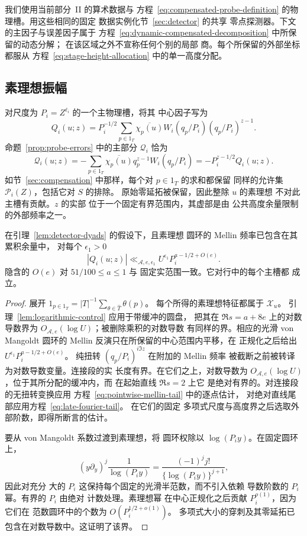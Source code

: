 我们使用当前部分~II 的算术数据与
方程~\eqref{eq:compensated-probe-definition} 的物理槽。用这些相同的固定
数据实例化节~\ref{sec:detector} 的共享
零点探测器。下文的主因子与误差因子属于
方程~\eqref{eq:dynamic-compensated-decomposition} 中所保留的动态分解；
在该区域之外不宣称任何个别的局部
商。每个所保留的外部坐标都服从
方程~\eqref{eq:stage-height-allocation} 中的单一高度分配。

\subsection{素理想振幅}\label{sec:amplitudes}

对尺度为 \(P_i=Z^{\ell_i}\) 的一个主物理槽，将其
中心因子写为
\[
 Q_i(u;z)=P_i^{-1/2}\sum_{p\in1_T}
   \overline{\chi_p(u)}W_i(q_p/P_i)(q_p/P_i)^{z-1}.
\]
命题~\ref{prop:probe-errors} 中的主部分 \(\mathcal Q_i\) 恰为
\[
 \mathcal Q_i(u;z)=-\sum_{p\in1_T}\overline{\chi_p(u)}q_p^{z-1}W_i(q_p/P_i)
 =-P_i^{z-1/2}Q_i(u;z).
\]
如节~\ref{sec:compensation} 中那样，每个对 \(p\in1_T\) 的求和都保留
同样的允许集 \(\mathcal P_i(Z)\)，包括它对 \(S\) 的排除。
原始零延拓被保留，因此整除 \(u\) 的素理想
不对此主槽有贡献。\(z\) 的实部
位于一个固定有界范围内，其虚部是由
公共高度余量限制的外部频率之一。

\begin{lemma}[分箱中的素理想界]\label{lem:bin-prime-bound}
在引理~\ref{lem:detector-dyads} 的假设下，且素理想
圆环的 Mellin 频率已包含在其累积余量中，
对每个 \(\epsilon_1>0\)
\[
 |Q_i(u;z)|\ll_{\mathcal A,e,\epsilon_1}
 U^{\epsilon_1}P_i^{a-1/2+O(e)}.
\]
隐含的 \(O(e)\) 对 \(51/100\le a\le1\) 与
固定实范围一致。它对行中的每个主槽都
成立。
\end{lemma}

\begin{proof}
展开 \(1_{p\in1_T}=|T|^{-1}\sum_{\theta\in\widehat T}\theta(p)\)。
每个所得的素理想特征都属于 \(\mathcal X_u\)。
引理~\ref{lem:logarithmic-control} 应用于带缓冲的圆盘，
把其在 \(\Re s=a+8e\) 上的对数导数界为
\(O_{\mathcal A,e}(\log U)\)；被删除乘积的对数导数
有同样的界。相应的光滑 von Mangoldt 圆环的
Mellin 反演只在所保留的中心范围内平移，在
正规化之后给出
\(U^{\epsilon_1}P_i^{a-1/2+O(e)}\)。
纯扭转 \((q_p/P_i)^{i\Im z}\) 在附加的 Mellin 频率
被截断之前被转译为对数导数变量。连接段的实
长度有界。在它们之上，对数导数为
\(O_{\mathcal A,e}(\log U)\)，位于其所分配的缓冲内，而
在起始直线 \(\Re s=2\) 上它
是绝对有界的。对连接段的无扭转变换应用
方程~\eqref{eq:pointwise-mellin-tail} 中的逐点估计，
对绝对直线尾部应用方程~\eqref{eq:late-fourier-tail}。
在它们的固定
多项式尺度与高度界之后选取外部阶数，即得所断言的估计。

要从 von Mangoldt 系数过渡到素理想，将
圆环权除以 \(\log(P_i y)\)。在固定圆环上，
\[
 (y\partial_y)^j\frac1{\log(P_i y)}
 =\frac{(-1)^j j!}{\{\log(P_i y)\}^{j+1}},
\]
因此对充分
大的 \(P_i\) 这保持每个固定的光滑半范数，而不引入依赖
导数阶数的 \(P_i\) 幂。有界的 \(P_i\) 由绝对
计数处理。素理想幂
在中心正规化之后贡献 \(P_i^{o(1)}\)，因为它们在
范数圆环中的个数为 \(O(P_i^{1/2+o(1)})\)。
多项式大小的穿刺及其零延拓已
包含在对数导数中。这证明了该界。
\end{proof}

